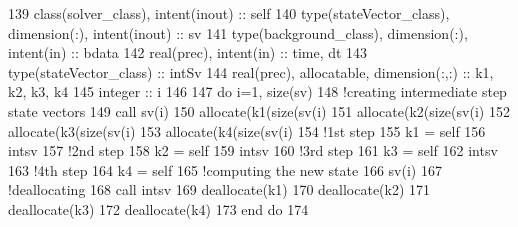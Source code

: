 \begin{DoxyCode}
139     \textcolor{keywordtype}{class}(solver\_class), \textcolor{keywordtype}{intent(inout)} :: self
140     \textcolor{keywordtype}{type}(stateVector\_class), \textcolor{keywordtype}{dimension(:)}, \textcolor{keywordtype}{intent(inout)} :: sv
141     \textcolor{keywordtype}{type}(background\_class), \textcolor{keywordtype}{dimension(:)}, \textcolor{keywordtype}{intent(in)} :: bdata
142     \textcolor{keywordtype}{real(prec)}, \textcolor{keywordtype}{intent(in)} :: time, dt
143     \textcolor{keywordtype}{type}(stateVector\_class) :: intSv
144     \textcolor{keywordtype}{real(prec)}, \textcolor{keywordtype}{allocatable}, \textcolor{keywordtype}{dimension(:,:)} :: k1, k2, k3, k4
145     \textcolor{keywordtype}{integer} :: i
146 
147     \textcolor{keywordflow}{do} i=1, \textcolor{keyword}{size}(sv)
148         \textcolor{comment}{!creating intermediate step state vectors}
149         \textcolor{keyword}{call }sv(i)%
150         \textcolor{keyword}{allocate}(k1(\textcolor{keyword}{size}(sv(i)%
151         \textcolor{keyword}{allocate}(k2(\textcolor{keyword}{size}(sv(i)%
152         \textcolor{keyword}{allocate}(k3(\textcolor{keyword}{size}(sv(i)%
153         \textcolor{keyword}{allocate}(k4(\textcolor{keyword}{size}(sv(i)%
154         \textcolor{comment}{!1st step}
155         k1 = self%
156         intsv%
157         \textcolor{comment}{!2nd step}
158         k2 = self%
159         intsv%
160         \textcolor{comment}{!3rd step}
161         k3 = self%
162         intsv%
163         \textcolor{comment}{!4th step}
164         k4 = self%
165         \textcolor{comment}{!computing the new state}
166         sv(i)%
167         \textcolor{comment}{!deallocating}
168         \textcolor{keyword}{call }intsv%
169         \textcolor{keyword}{deallocate}(k1)
170         \textcolor{keyword}{deallocate}(k2)
171         \textcolor{keyword}{deallocate}(k3)
172         \textcolor{keyword}{deallocate}(k4)
173 \textcolor{keywordflow}{    end do}
174 
\end{DoxyCode}
